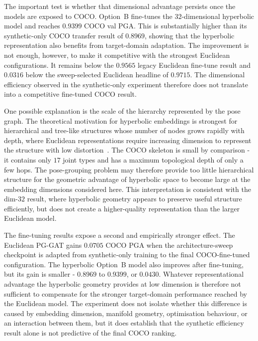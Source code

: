 The important test is whether that dimensional advantage persists once
the models are exposed to COCO.
Option~B fine-tunes the $32$-dimensional hyperbolic model and reaches
$0.9399$ COCO val PGA.
This is substantially higher than its synthetic-only COCO transfer
result of $0.8969$,
showing that the hyperbolic representation also benefits from
target-domain adaptation.
The improvement is not enough, however, to make it competitive with
the strongest Euclidean configurations.
It remains below the $0.9565$ legacy Euclidean fine-tune result and
$0.0316$ below the sweep-selected Euclidean headline of $0.9715$.
The dimensional efficiency observed in the synthetic-only experiment
therefore does not translate into a competitive fine-tuned COCO result.

One possible explanation is the scale of the hierarchy represented by
the pose graph.
The theoretical motivation for hyperbolic embeddings is strongest for
hierarchical and tree-like structures whose number of nodes grows
rapidly with depth,
where Euclidean representations require increasing dimension to
represent the structure with low distortion~\cite{sarkar2011treeembed}.
The COCO skeleton is small by comparison -
it contains only $17$ joint types and has a maximum topological depth
of only a few hops.
The pose-grouping problem may therefore provide too little hierarchical
structure for the geometric advantage of hyperbolic space to become
large at the embedding dimensions considered here.
This interpretation is consistent with the dim-$32$ result,
where hyperbolic geometry appears to preserve useful structure
efficiently,
but does not create a higher-quality representation than the larger
Euclidean model.

The fine-tuning results expose a second and empirically stronger effect.
The Euclidean PG-GAT gains $0.0705$ COCO PGA when the architecture-sweep
checkpoint is adapted from synthetic-only training to the final
COCO-fine-tuned configuration.
The hyperbolic Option~B model also improves after fine-tuning,
but its gain is smaller -
$0.8969$ to $0.9399$, or $0.0430$.
Whatever representational advantage the hyperbolic geometry provides
at low dimension is therefore not sufficient to compensate for the
stronger target-domain performance reached by the Euclidean model.
The experiment does not isolate whether this difference is caused by
embedding dimension,
manifold geometry,
optimisation behaviour,
or an interaction between them,
but it does establish that the synthetic efficiency result alone is not
predictive of the final COCO ranking.

